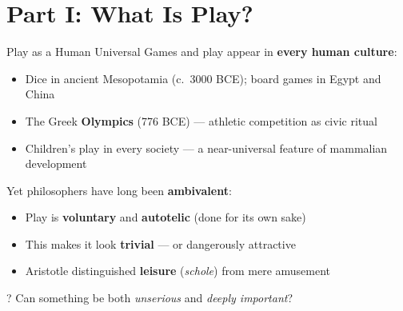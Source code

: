 \documentclass[aspectratio=169,11pt]{beamer}
\begin{document}
\section{Part I: What Is Play?}

\begin{frame}{Play as a Human Universal}
\footnotesize
Games and play appear in \textbf{every human culture}:
\begin{itemize}
    \item Dice in ancient Mesopotamia (c.~3000 BCE); board games in Egypt and China
    \item The Greek \textbf{Olympics} (776 BCE) --- athletic competition as civic ritual
    \item Children's play in every society --- a near-universal feature of mammalian development
\end{itemize}

\vspace{0.15cm}
Yet philosophers have long been \textbf{ambivalent}:
\begin{itemize}
    \item Play is \textbf{voluntary} and \textbf{autotelic} (done for its own sake)
    \item This makes it look \textbf{trivial} --- or dangerously attractive
    \item Aristotle distinguished \textbf{leisure} (\emph{schole}) from mere amusement
\end{itemize}

\begin{alertblock}{?}
Can something be both \emph{unserious} and \emph{deeply important}?
\end{alertblock}
\end{frame}
\end{document}
